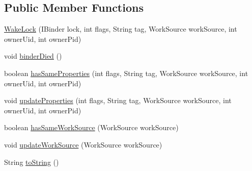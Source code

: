 \subsection*{Public Member Functions}
\begin{DoxyCompactItemize}
\item 
\hyperlink{classcom_1_1android_1_1server_1_1power_1_1PowerManagerService_1_1WakeLock_a241c232476adef32c7a15dda4d5fe263}{Wake\-Lock} (I\-Binder lock, int flags, String tag, Work\-Source work\-Source, int owner\-Uid, int owner\-Pid)
\item 
void \hyperlink{classcom_1_1android_1_1server_1_1power_1_1PowerManagerService_1_1WakeLock_a8c60494b903319b82ec9a20fe0264793}{binder\-Died} ()
\item 
boolean \hyperlink{classcom_1_1android_1_1server_1_1power_1_1PowerManagerService_1_1WakeLock_a0a0f42ce26c356cb49e8065bb01b3f94}{has\-Same\-Properties} (int flags, String tag, Work\-Source work\-Source, int owner\-Uid, int owner\-Pid)
\item 
void \hyperlink{classcom_1_1android_1_1server_1_1power_1_1PowerManagerService_1_1WakeLock_ad0c79c0d084cc471fe37261a61cef6bc}{update\-Properties} (int flags, String tag, Work\-Source work\-Source, int owner\-Uid, int owner\-Pid)
\item 
boolean \hyperlink{classcom_1_1android_1_1server_1_1power_1_1PowerManagerService_1_1WakeLock_aa7c1498475258a26184e6172457987ee}{has\-Same\-Work\-Source} (Work\-Source work\-Source)
\item 
void \hyperlink{classcom_1_1android_1_1server_1_1power_1_1PowerManagerService_1_1WakeLock_ab365b0d41c9079b72a672c8b18dc9246}{update\-Work\-Source} (Work\-Source work\-Source)
\item 
String \hyperlink{classcom_1_1android_1_1server_1_1power_1_1PowerManagerService_1_1WakeLock_aab044511660feecadd1e078962656d72}{to\-String} ()
\end{DoxyCompactItemize}
